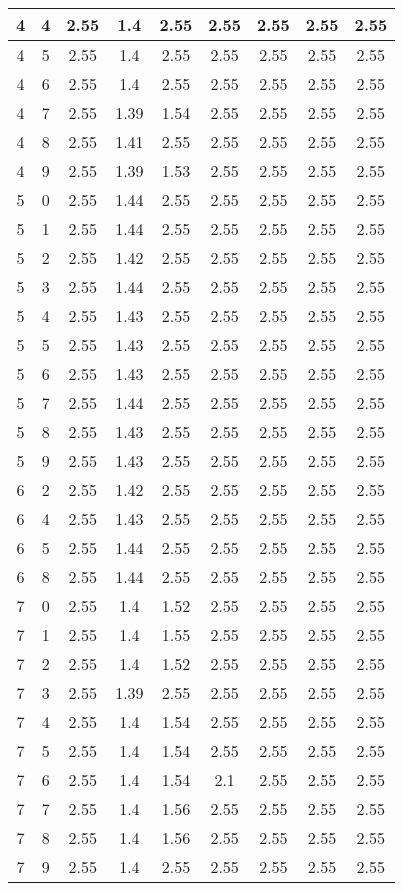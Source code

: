 \begin{longtable}{|c|c||c||c|c|c||c|c|c|}
	4 & 4 & 2.55 & 1.4 & 2.55 & 2.55 & 2.55 & 2.55 & 2.55 \\ \hline
	4 & 5 & 2.55 & 1.4 & 2.55 & 2.55 & 2.55 & 2.55 & 2.55 \\ \hline
	4 & 6 & 2.55 & 1.4 & 2.55 & 2.55 & 2.55 & 2.55 & 2.55 \\ \hline
	4 & 7 & 2.55 & 1.39 & 1.54 & 2.55 & 2.55 & 2.55 & 2.55 \\ \hline
	4 & 8 & 2.55 & 1.41 & 2.55 & 2.55 & 2.55 & 2.55 & 2.55 \\ \hline
	4 & 9 & 2.55 & 1.39 & 1.53 & 2.55 & 2.55 & 2.55 & 2.55 \\ \hline
	5 & 0 & 2.55 & 1.44 & 2.55 & 2.55 & 2.55 & 2.55 & 2.55 \\ \hline
	5 & 1 & 2.55 & 1.44 & 2.55 & 2.55 & 2.55 & 2.55 & 2.55 \\ \hline
	5 & 2 & 2.55 & 1.42 & 2.55 & 2.55 & 2.55 & 2.55 & 2.55 \\ \hline
	5 & 3 & 2.55 & 1.44 & 2.55 & 2.55 & 2.55 & 2.55 & 2.55 \\ \hline
	5 & 4 & 2.55 & 1.43 & 2.55 & 2.55 & 2.55 & 2.55 & 2.55 \\ \hline
	5 & 5 & 2.55 & 1.43 & 2.55 & 2.55 & 2.55 & 2.55 & 2.55 \\ \hline
	5 & 6 & 2.55 & 1.43 & 2.55 & 2.55 & 2.55 & 2.55 & 2.55 \\ \hline
	5 & 7 & 2.55 & 1.44 & 2.55 & 2.55 & 2.55 & 2.55 & 2.55 \\ \hline
	5 & 8 & 2.55 & 1.43 & 2.55 & 2.55 & 2.55 & 2.55 & 2.55 \\ \hline
	5 & 9 & 2.55 & 1.43 & 2.55 & 2.55 & 2.55 & 2.55 & 2.55 \\ \hline
	6 & 2 & 2.55 & 1.42 & 2.55 & 2.55 & 2.55 & 2.55 & 2.55 \\ \hline
	6 & 4 & 2.55 & 1.43 & 2.55 & 2.55 & 2.55 & 2.55 & 2.55 \\ \hline
	6 & 5 & 2.55 & 1.44 & 2.55 & 2.55 & 2.55 & 2.55 & 2.55 \\ \hline
	6 & 8 & 2.55 & 1.44 & 2.55 & 2.55 & 2.55 & 2.55 & 2.55 \\ \hline
	7 & 0 & 2.55 & 1.4 & 1.52 & 2.55 & 2.55 & 2.55 & 2.55 \\ \hline
	7 & 1 & 2.55 & 1.4 & 1.55 & 2.55 & 2.55 & 2.55 & 2.55 \\ \hline
	7 & 2 & 2.55 & 1.4 & 1.52 & 2.55 & 2.55 & 2.55 & 2.55 \\ \hline
	7 & 3 & 2.55 & 1.39 & 2.55 & 2.55 & 2.55 & 2.55 & 2.55 \\ \hline
	7 & 4 & 2.55 & 1.4 & 1.54 & 2.55 & 2.55 & 2.55 & 2.55 \\ \hline
	7 & 5 & 2.55 & 1.4 & 1.54 & 2.55 & 2.55 & 2.55 & 2.55 \\ \hline
	7 & 6 & 2.55 & 1.4 & 1.54 & 2.1 & 2.55 & 2.55 & 2.55 \\ \hline
	7 & 7 & 2.55 & 1.4 & 1.56 & 2.55 & 2.55 & 2.55 & 2.55 \\ \hline
	7 & 8 & 2.55 & 1.4 & 1.56 & 2.55 & 2.55 & 2.55 & 2.55 \\ \hline
	7 & 9 & 2.55 & 1.4 & 2.55 & 2.55 & 2.55 & 2.55 & 2.55 \\ \hline
\end{longtable}
